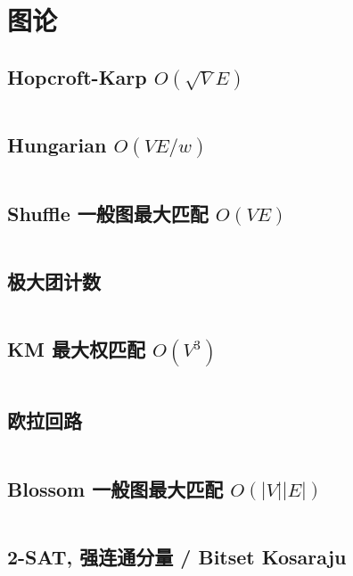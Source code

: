 \section{图论}
				\subsection{Hopcroft-Karp $O(\sqrt{V} E)$}
					\inputminted[highlightlines={5,9}]{cpp}{src/TreeandGraph/hk_skip2004.cpp}
				\subsection{Hungarian $O(V E / w)$}
					\inputminted{cpp}{src/TreeandGraph/Hungarian.cpp}
				\subsection{Shuffle 一般图最大匹配 $O(V E)$}
					\inputminted{cpp}{src/TreeandGraph/一般图最大匹配-shuffle.cpp}
				\subsection{极大团计数}
					\inputminted{cpp}{src/TreeandGraph/CliqueCount.cpp}
				\subsection{KM 最大权匹配 $O(V^3)$}
					\inputminted{cpp}{src/TreeandGraph/KM.cpp}
				\subsection{欧拉回路}
				\inputminted{cpp}{src/TreeandGraph/欧拉回路.cpp}
				\subsection{Blossom 一般图最大匹配 $O(|V||E|)$}
					\inputminted{cpp}{src/TreeandGraph/Blossom.cpp}
				\subsection{2-SAT, 强连通分量 / Bitset Kosaraju}
					\inputminted{cpp}{src/TreeandGraph/2-sat.cpp}
					\inputminted{cpp}{src/TreeandGraph/kosaraju.cpp}
